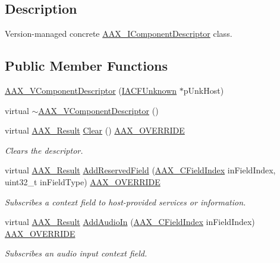\subsection{Description}
Version-\/managed concrete \hyperlink{a00088}{A\+A\+X\+\_\+\+I\+Component\+Descriptor} class. \subsection*{Public Member Functions}
\begin{DoxyCompactItemize}
\item 
\hyperlink{a00131_ac7afc2d0da1ba680cfe5316facfff038}{A\+A\+X\+\_\+\+V\+Component\+Descriptor} (\hyperlink{a00146}{I\+A\+C\+F\+Unknown} $\ast$p\+Unk\+Host)
\item 
virtual \hyperlink{a00131_acfe362535f9bdd3330105f55e22e0453}{$\sim$\+A\+A\+X\+\_\+\+V\+Component\+Descriptor} ()
\item 
virtual \hyperlink{a00149_a4d8f69a697df7f70c3a8e9b8ee130d2f}{A\+A\+X\+\_\+\+Result} \hyperlink{a00131_aca0353c3d58f1a4964e2757950fd82c2}{Clear} () \hyperlink{a00149_ac2f24a5172689ae684344abdcce55463}{A\+A\+X\+\_\+\+O\+V\+E\+R\+R\+I\+D\+E}
\begin{DoxyCompactList}\small\item\em Clears the descriptor. \end{DoxyCompactList}\item 
virtual \hyperlink{a00149_a4d8f69a697df7f70c3a8e9b8ee130d2f}{A\+A\+X\+\_\+\+Result} \hyperlink{a00131_ace29d982cbf54e3642dbe259b4b17256}{Add\+Reserved\+Field} (\hyperlink{a00149_ae807f8986143820cfb5d6da32165c9c7}{A\+A\+X\+\_\+\+C\+Field\+Index} in\+Field\+Index, uint32\+\_\+t in\+Field\+Type) \hyperlink{a00149_ac2f24a5172689ae684344abdcce55463}{A\+A\+X\+\_\+\+O\+V\+E\+R\+R\+I\+D\+E}
\begin{DoxyCompactList}\small\item\em Subscribes a context field to host-\/provided services or information. \end{DoxyCompactList}\item 
virtual \hyperlink{a00149_a4d8f69a697df7f70c3a8e9b8ee130d2f}{A\+A\+X\+\_\+\+Result} \hyperlink{a00131_aa49a6ea8fefc9b1beb15c122ac91a79b}{Add\+Audio\+In} (\hyperlink{a00149_ae807f8986143820cfb5d6da32165c9c7}{A\+A\+X\+\_\+\+C\+Field\+Index} in\+Field\+Index) \hyperlink{a00149_ac2f24a5172689ae684344abdcce55463}{A\+A\+X\+\_\+\+O\+V\+E\+R\+R\+I\+D\+E}
\begin{DoxyCompactList}\small\item\em Subscribes an audio input context field. \end{DoxyCompactList}\item 

\end{DoxyCompactItemize}
